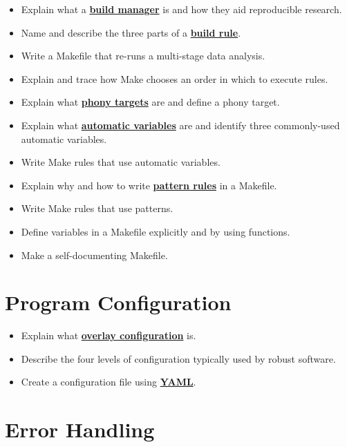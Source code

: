 \documentclass[
]{krantz}
\providecommand{\tightlist}{%
  \setlength{\itemsep}{0pt}\setlength{\parskip}{0pt}}
\newcommand{\gref}[2]{\hyperlink{#2}{\textbf{#1}}}
\begin{document}
\begin{itemize}
\tightlist
\item
  Explain what a \gref{build manager}{build\_manager} is and how they aid reproducible research.
\item
  Name and describe the three parts of a \gref{build rule}{build\_rule}.
\item
  Write a Makefile that re-runs a multi-stage data analysis.
\item
  Explain and trace how Make chooses an order in which to execute rules.
\item
  Explain what \gref{phony targets}{phony\_target} are and define a phony target.
\item
  Explain what \gref{automatic variables}{automatic\_variable} are and identify three commonly-used automatic variables.
\item
  Write Make rules that use automatic variables.
\item
  Explain why and how to write \gref{pattern rules}{pattern\_rule} in a Makefile.
\item
  Write Make rules that use patterns.
\item
  Define variables in a Makefile explicitly and by using functions.
\item
  Make a self-documenting Makefile.
\end{itemize}

\hypertarget{program-configuration}{%
\section{Program Configuration}\label{program-configuration}}

\begin{itemize}
\tightlist
\item
  Explain what \gref{overlay configuration}{overlay\_configuration} is.
\item
  Describe the four levels of configuration typically used by robust software.
\item
  Create a configuration file using \gref{YAML}{yaml}.
\end{itemize}

\hypertarget{error-handling}{%
\section{Error Handling}\label{error-handling}}
\end{document}
